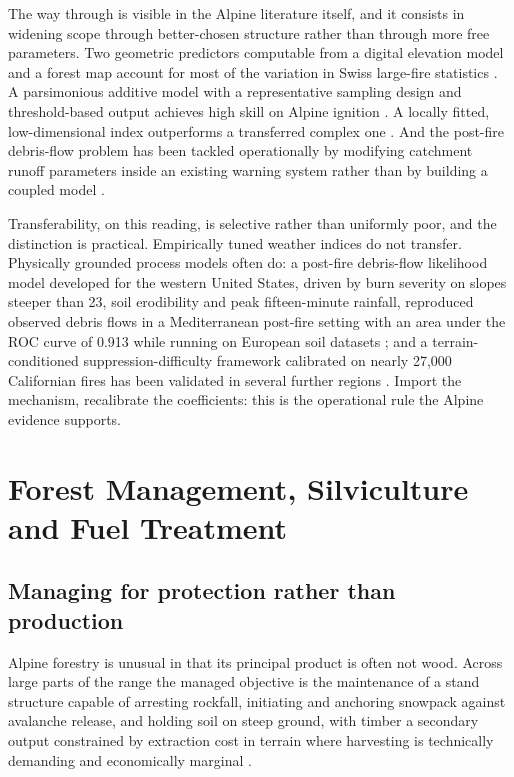 \documentclass[11pt,a4paper]{article}
\begin{document}
The way through is visible in the Alpine literature itself, and it consists in widening scope through better-chosen structure rather than through more free parameters. Two geometric predictors computable from a digital elevation model and a forest map account for most of the variation in Swiss large-fire statistics \citep{conedera_linking_2024}. A parsimonious additive model with a representative sampling design and threshold-based output achieves high skill on Alpine ignition \citep{moreno_1_nodate}. A locally fitted, low-dimensional index outperforms a transferred complex one \citep{de_angelis_modelling_2015}. And the post-fire debris-flow problem has been tackled operationally by modifying catchment runoff parameters inside an existing warning system rather than by building a coupled model \citep{tiranti_wildfires_2021}.

Transferability, on this reading, is selective rather than uniformly poor, and the distinction is practical. Empirically tuned weather indices do not transfer. Physically grounded process models often do: a post-fire debris-flow likelihood model developed for the western United States, driven by burn severity on slopes steeper than 23\degree{}, soil erodibility and peak fifteen-minute rainfall, reproduced observed debris flows in a Mediterranean post-fire setting with an area under the ROC curve of 0.913 while running on European soil datasets \citep{diakakis_exploring_2023}; and a terrain-conditioned suppression-difficulty framework calibrated on nearly 27{,}000 Californian fires has been validated in several further regions \citep{cardil_assessing_2025}. Import the mechanism, recalibrate the coefficients: this is the operational rule the Alpine evidence supports.


\section{Forest Management, Silviculture and Fuel Treatment}
\label{sec:silviculture}

\subsection{Managing for protection rather than production}

Alpine forestry is unusual in that its principal product is often not wood. Across large parts of the range the managed objective is the maintenance of a stand structure capable of arresting rockfall, initiating and anchoring snowpack against avalanche release, and holding soil on steep ground, with timber a secondary output constrained by extraction cost in terrain where harvesting is technically demanding and economically marginal \citep{dinca_timber_2025}.
\end{document}
